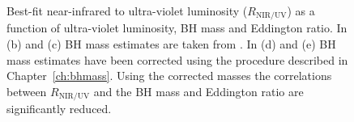\begin{figure}
\captionsetup[subfigure]{labelformat=empty}  
  \centering
  \subfloat[\label{fig:correlations_contour_a}]{}
  \subfloat[\label{fig:correlations_contour_b}]{}
  \subfloat[\label{fig:correlations_contour_c}]{}
  \subfloat[\label{fig:correlations_contour_d}]{}
  \subfloat[\label{fig:correlations_contour_e}]{}
  \caption[{Best-fit near-infrared to ultra-violet luminosity as a function of ultra-violet luminosity, BH mass and Eddington ratio.}]{Best-fit near-infrared to ultra-violet luminosity ($R_{\text{NIR/UV}}$) as a function of ultra-violet luminosity, BH mass and Eddington ratio. In (b) and (c) BH mass estimates are taken from \citet{shen11}. In (d) and (e) BH mass estimates have been corrected using the procedure described in Chapter~\ref{ch:bhmass}. Using the corrected masses the correlations between $R_{\text{NIR/UV}}$ and the BH mass and Eddington ratio are significantly reduced.}
  \label{fig:correlations_contour}
\end{figure}

